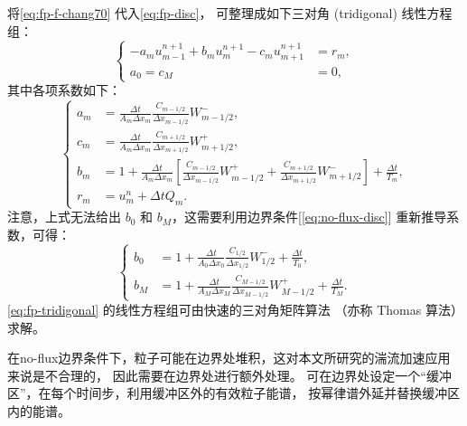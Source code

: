 将\autoref{eq:fp-f-chang70} 代入\autoref{eq:fp-disc}，
可整理成如下三对角 (tridigonal) 线性方程组：
\begin{equation}
  \label{eq:fp-tridigonal}
  \left\{
    \begin{aligned}
      -a_m u_{m-1}^{n+1} + b_m u_m^{n+1} - c_m u_{m+1}^{n+1} & = r_m, \\
      a_0 = c_M & = 0 ,
    \end{aligned}
  \right.
\end{equation}
其中各项系数如下：
\begin{equation}
  \label{eq:fp-coefs}
  \left\{
    \begin{aligned}
      a_m & = \frac{\Delta t}{A_m \Delta x_m}
        \frac{C_{m-1/2}}{\Delta x_{m-1/2}} W_{m-1/2}^{-} , \\
      c_m & = \frac{\Delta t}{A_m \Delta x_m}
        \frac{C_{m+1/2}}{\Delta x_{m+1/2}} W_{m+1/2}^{+} , \\
      b_m & = 1 + \frac{\Delta t}{A_m \Delta x_m}
        \left[ \frac{C_{m-1/2}}{\Delta x_{m-1/2}} W_{m-1/2}^{+}
        + \frac{C_{m+1/2}}{\Delta x_{m+1/2}} W_{m+1/2}^{-} \right]
        + \frac{\Delta t}{T_m} , \\
      r_m & = u_m^n + \Delta t Q_m .
    \end{aligned}
  \right.
\end{equation}
注意，上式无法给出 $b_0$ 和 $b_M$，这需要利用边界条件[\autoref{eq:no-flux-disc}]
重新推导系数，可得：
\begin{equation}
  \label{eq:fp-coefs-b}
  \left\{
    \begin{aligned}
      b_0 & = 1 + \frac{\Delta t}{A_0 \Delta x_0}
        \frac{C_{1/2}}{\Delta x_{1/2}} W_{1/2}^{-}
        + \frac{\Delta t}{T_0} , \\
      b_M & = 1 + \frac{\Delta t}{A_M \Delta x_M}
        \frac{C_{M-1/2}}{\Delta x_{M-1/2}} W_{M-1/2}^{+}
        + \frac{\Delta t}{T_M} .
    \end{aligned}
  \right.
\end{equation}
\autoref{eq:fp-tridigonal} 的线性方程组可由快速的三对角矩阵算法
（亦称 Thomas 算法）求解\cite{press1992}。

在\ac{no-flux}边界条件下，粒子可能在边界处堆积，这对本文所研究的湍流加速应用来说是不合理的，
因此需要在边界处进行额外处理。
可在边界处设定一个\enquote{缓冲区}，在每个时间步，利用缓冲区外的有效粒子能谱，
按幂律谱外延并替换缓冲区内的能谱\cite{borovsky1986,donnert2014}。


